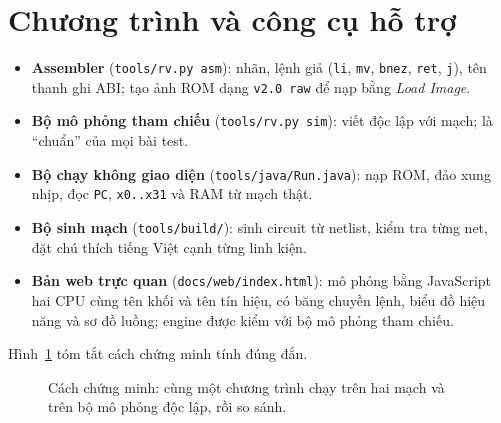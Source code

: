 \documentclass[11pt,a4paper]{article}
\newcommand{\sig}[1]{\texttt{\detokenize{#1}}}
\begin{document}
\section{Chương trình và công cụ hỗ trợ}
\begin{itemize}
  \item \textbf{Assembler} (\texttt{tools/rv.py asm}): nhãn, lệnh giả (\texttt{li}, \texttt{mv}, \texttt{bnez}, \texttt{ret}, \texttt{j}), tên thanh ghi ABI; tạo ảnh ROM dạng \texttt{v2.0 raw} để nạp bằng \emph{Load Image}.
  \item \textbf{Bộ mô phỏng tham chiếu} (\texttt{tools/rv.py sim}): viết độc lập với mạch; là ``chuẩn'' của mọi bài test.
  \item \textbf{Bộ chạy không giao diện} (\texttt{tools/java/Run.java}): nạp ROM, đảo xung nhịp, đọc \texttt{PC}, \texttt{x0..x31} và RAM từ mạch thật.
  \item \textbf{Bộ sinh mạch} (\texttt{tools/build/}): sinh circuit từ netlist, kiểm tra từng net, đặt chú thích tiếng Việt cạnh từng linh kiện.
  \item \textbf{Bản web trực quan} (\texttt{docs/web/index.html}): mô phỏng bằng JavaScript hai CPU cùng tên khối và tên tín hiệu, có băng chuyền lệnh, biểu đồ hiệu năng và sơ đồ luồng; engine được kiểm với bộ mô phỏng tham chiếu.
\end{itemize}

Hình~\ref{fig:proof} tóm tắt cách chứng minh tính đúng đắn.

\begin{figure}[htbp]
\centering
{}
\caption{Cách chứng minh: cùng một chương trình chạy trên hai mạch và trên bộ mô phỏng độc lập, rồi so sánh.}
\label{fig:proof}
\end{figure}
\end{document}
